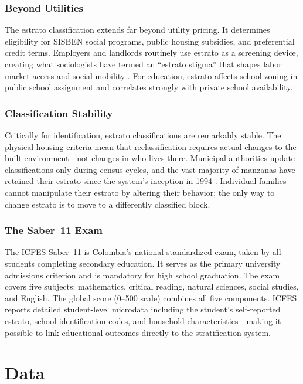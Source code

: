 \documentclass[12pt]{article}
\begin{document}
\subsubsection*{Beyond Utilities} The estrato classification extends far beyond utility pricing. It determines eligibility for SISBEN social programs, public housing subsidies, and preferential credit terms. Employers and landlords routinely use estrato as a screening device, creating what sociologists have termed an ``estrato stigma'' that shapes labor market access and social mobility \citep{uribe2008estrato}. For education, estrato affects school zoning in public school assignment and correlates strongly with private school availability.

\subsubsection*{Classification Stability} Critically for identification, estrato classifications are remarkably stable. The physical housing criteria mean that reclassification requires actual changes to the built environment---not changes in who lives there. Municipal authorities update classifications only during census cycles, and the vast majority of manzanas have retained their estrato since the system's inception in 1994 \citep{medina2007stratification}. Individual families cannot manipulate their estrato by altering their behavior; the only way to change estrato is to move to a differently classified block.

\subsubsection*{The Saber~11 Exam} The ICFES Saber~11 is Colombia's national standardized exam, taken by all students completing secondary education. It serves as the primary university admissions criterion and is mandatory for high school graduation. The exam covers five subjects: mathematics, critical reading, natural sciences, social studies, and English. The global score (0--500 scale) combines all five components. ICFES reports detailed student-level microdata including the student's self-reported estrato, school identification codes, and household characteristics---making it possible to link educational outcomes directly to the stratification system.

\section{Data}
\end{document}
